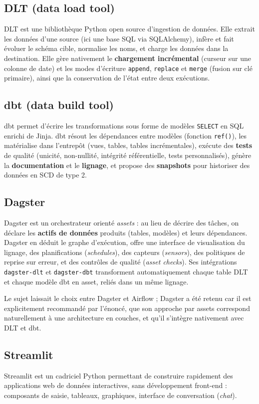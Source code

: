 \subsection{DLT (data load tool)}
DLT est une bibliothèque Python open source d'ingestion de données. Elle extrait les données d'une source
(ici une base SQL via SQLAlchemy), infère et fait évoluer le schéma cible, normalise les noms, et charge
les données dans la destination. Elle gère nativement le \textbf{chargement incrémental} (curseur sur
une colonne de date) et les modes d'écriture \texttt{append}, \texttt{replace} et \texttt{merge}
(fusion sur clé primaire), ainsi que la conservation de l'état entre deux exécutions.

\subsection{dbt (data build tool)}
dbt permet d'écrire les transformations sous forme de modèles \texttt{SELECT} en SQL enrichi de Jinja.
dbt résout les dépendances entre modèles (fonction \texttt{ref()}), les matérialise dans l'entrepôt
(vues, tables, tables incrémentales), exécute des \textbf{tests} de qualité (unicité, non-nullité,
intégrité référentielle, tests personnalisés), génère la \textbf{documentation} et le \textbf{lignage},
et propose des \textbf{snapshots} pour historiser des données en SCD de type 2.

\subsection{Dagster}
Dagster est un orchestrateur orienté \emph{assets} : au lieu de décrire des tâches, on déclare les
\textbf{actifs de données} produits (tables, modèles) et leurs dépendances. Dagster en déduit le graphe
d'exécution, offre une interface de visualisation du lignage, des planifications (\emph{schedules}), des
capteurs (\emph{sensors}), des politiques de reprise sur erreur, et des contrôles de qualité
(\emph{asset checks}). Ses intégrations \texttt{dagster-dlt} et \texttt{dagster-dbt} transforment
automatiquement chaque table DLT et chaque modèle dbt en asset, reliés dans un même lignage.

Le sujet laissait le choix entre Dagster et Airflow ; Dagster a été retenu car il est explicitement
recommandé par l'énoncé, que son approche par assets correspond naturellement à une architecture en
couches, et qu'il s'intègre nativement avec DLT et dbt.

\subsection{Streamlit}
Streamlit est un cadriciel Python permettant de construire rapidement des applications web de données
interactives, sans développement front-end : composants de saisie, tableaux, graphiques, interface de
conversation (\emph{chat}).

